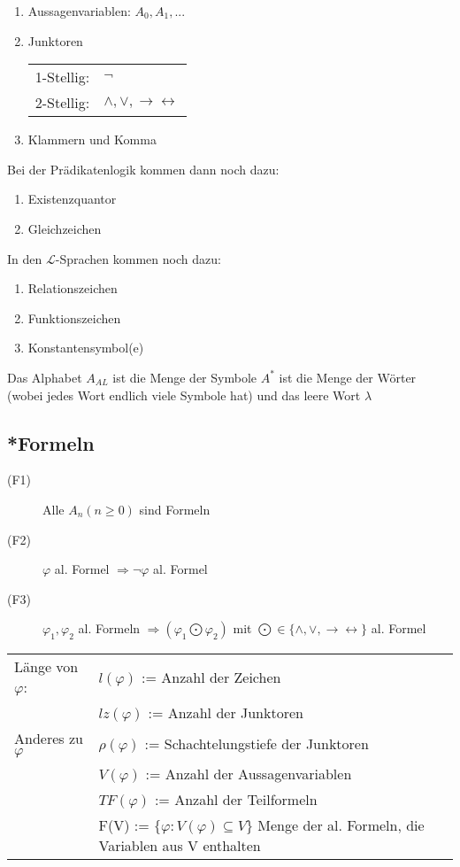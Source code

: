 \documentclass[12pt,a4paper]{article} %
\begin{document}
	\begin{enumerate}
		\item Aussagenvariablen: $A_0, A_1, ...$
		\item Junktoren \begin{tabular}{l l}
			1-Stellig: & $\neg$ \\
			2-Stellig: & $\land, \lor, \rightarrow \leftrightarrow$
		\end{tabular}
		\item Klammern und Komma
	\end{enumerate}
	Bei der Prädikatenlogik kommen dann noch dazu:
	\begin{enumerate}
		\addtocounter{enumi}{3}
		\item Existenzquantor
		\item Gleichzeichen
	\end{enumerate}
	In den $\mathcal{L}$-Sprachen kommen noch dazu:
	\begin{enumerate}
		\addtocounter{enumi}{5}
		\item Relationszeichen
		\item Funktionszeichen
		\item Konstantensymbol(e)
	\end{enumerate}
	Das Alphabet $A_{AL}$ ist die Menge der Symbole \newline
	$A^*$ ist die Menge der Wörter (wobei jedes Wort endlich viele Symbole hat) und das leere Wort $\lambda$
	
	\subsection{*Formeln}
	\label{Formel}
	\begin{description}
		\item[(F1)] Alle $A_{n}(n \ge 0)$ sind Formeln
		\item[(F2)] $\varphi$ al. Formel $\Rightarrow \neg \varphi$ al. Formel
		\item[(F3)] $\varphi_1, \varphi_2$ al. Formeln $\Rightarrow (\varphi_1 \bigodot \varphi_2)$ mit $\bigodot \in \{\land, \lor, \rightarrow\leftrightarrow\}$ al. Formel
	\end{description}	
	
	\begin{tabular}{l p{10cm}}
		Länge von $\varphi$: & $l(\varphi)$ := Anzahl der Zeichen \\
		& $lz(\varphi)$ := Anzahl der Junktoren \\
		Anderes zu $\varphi$ & $\rho(\varphi)$ := Schachtelungstiefe der Junktoren \\
		& $V(\varphi)$ := Anzahl der Aussagenvariablen \\
		& $TF(\varphi)$ := Anzahl der Teilformeln \\
		& F(V) := $\{\varphi: V(\varphi) \subseteq V\}$ Menge der al. Formeln, die Variablen aus V enthalten
	\end{tabular}
	
\end{document}
